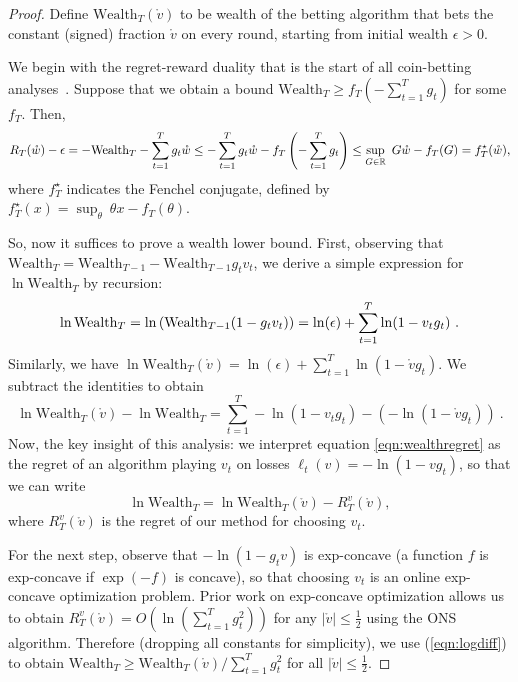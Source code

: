 \documentclass[12pt]{colt2018} %
\newcommand{\wealth}{\text{Wealth}}
\newcommand{\w}{\mathring{w}}
\renewcommand{\v}{\mathring{v}}
\begin{document}
\begin{proof}
Define $\wealth_T(\v)$ to be wealth of the betting algorithm that bets the constant (signed) fraction $\v$ on every round, starting from initial wealth $\epsilon>0$.

We begin with the regret-reward duality that is the start of all coin-betting analyses~\cite{orabona2016coin}. Suppose that we obtain a bound $\wealth_T\ge f_T\left(-\sum_{t=1}^T g_t\right)$ for some $f_T$. Then,
\vspace{-0.1cm}
\[
R_T(\w)-\epsilon
= - \wealth_T-\sum_{t=1}^T g_t\w
\le -\sum_{t=1}^T g_t\w-f_T\left(-\sum_{t=1}^T g_t\right)
\le \sup_{G\in \R} \ G\w - f_T(G)
=f_T^\star(\w),
\vspace{-0.1cm}
\]
where $f_T^\star$ indicates the Fenchel conjugate, defined by $f_T^\star(x) = \sup_{\theta} \ \theta x - f_T(\theta)$.

So, now it suffices to prove a wealth lower bound. First, observing that $\wealth_T= \wealth_{T-1}-\wealth_{T-1} g_t v_t$, we derive a simple expression for $\ln \wealth_T$ by recursion:
\vspace{-0.2cm}
\[
\ln \wealth_T
=\ln \left(\wealth_{T-1}(1-g_t v_t)\right)=\ln(\epsilon)+\sum_{t=1}^T \ln(1-v_tg_t)~.
\vspace{-0.1cm}
\]
Similarly, we have $\ln \wealth_T(\v) = \ln(\epsilon)+\sum_{t=1}^T \ln(1-\v g_t)$. We subtract the identities to obtain
\begin{equation}
\ln \wealth_T(\v) - \ln \wealth_T = \sum_{t=1}^T -\ln(1-v_tg_t)- (-\ln(1-\v g_t))~.\label{eqn:wealthregret}
\end{equation}
Now, the key insight of this analysis: we interpret equation \eqref{eqn:wealthregret} as the regret of an algorithm playing $v_t$ on losses $\ell_t(v) = -\ln(1-vg_t)$, so that we can write
\begin{equation}
\ln \wealth_T = \ln \wealth_T(\v) - R_T^{v}(\v),\label{eqn:logdiff}
\end{equation}
where $R_T^{v}(\v)$ is the regret of our method for choosing $v_t$.

For the next step, observe that $-\ln(1- g_t v)$ is exp-concave (a function $f$ is exp-concave if $\exp(-f)$ is concave), so that choosing $v_t$ is an online exp-concave optimization problem. Prior work on exp-concave optimization allows us to obtain $R^v_T(\v)=O\left(\ln\left(\sum_{t=1}^T g_t^2\right)\right)$ for any $|\v|\le \tfrac{1}{2}$ using the ONS algorithm. Therefore (dropping all constants for simplicity), we use (\ref{eqn:logdiff}) to obtain $\wealth_T \ge \wealth_T(\v) / \sum_{t=1}^T g_t^2$ for all $|\v|\le \tfrac{1}{2}$.


\end{proof}
\end{document}
